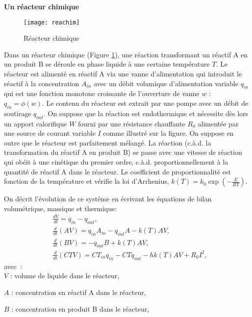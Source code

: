 \begin{exemple}{\bf  Un réacteur chimique }

\begin{figure}[ht]
\begin{center}
\texttt{[image: reachim]}
\caption{Réacteur chimique}
\label{fig:reachim}
\end{center}
\end{figure}
Dans un réacteur chimique (Figure \ref{fig:reachim}), une réaction transformant un réactif A en un produit B se déroule en phase liquide à une certaine température $T$.  Le réacteur est alimenté en réactif
A via une vanne d'alimentation qui introduit le réactif à la concentration
$A_{in}$ avec un débit volumique d'alimentation variable
$q_{in}$ qui est une fonction monotone croissante de l'ouverture de vanne $w$ : $q_{in} = \phi(w)$. Le contenu du réacteur est extrait par une pompe avec un débit de soutirage $q_{out}$. On suppose que la réaction est endothermique et nécessite dès lors un apport calorifique $W$ fourni par une résistance chauffante $R_0$ alimentée par une source de courant variable $I$ comme illustré sur la figure. On suppose en outre que le réacteur est
parfaitement mélangé. La réaction (c.à.d. la transformation du réactif A en
produit B) se passe avec une vitesse de réaction qui obéit à une cinétique du premier ordre, c.à.d. proportionnellement à la quantité de réactif A dans le
réacteur. Le coefficient de proportionnalité est fonction de la température
et vérifie la loi d'Arrhenius, $k(T)=k_0 \exp(-\frac{E}{RT})$.

On décrit l'évolution de ce système en écrivant les équations de bilan volumétrique, massique et thermique:
\begin{equation*} \begin{split} 
&\frac{dV}{dt} = q_{in} - q_{out},\\[0.3em]
&\frac{d}{dt}(AV) = q_{in}A_{in} -q_{out}A-k(T)AV, \\[0.3em]
&\frac{d}{dt}(BV) = -q_{out}B + k(T)AV, \\[0.3em]
&\frac{d}{dt}(CTV) = CT_{in}q_{in}-CTq_{out} - hk(T)AV + R_0I^2,
\end{split} \end{equation*}
avec~:\\

$V$ : volume de liquide dans le réacteur, 

$A$ : concentration en réactif A dans le réacteur,

$B$ : concentration en produit B dans le réacteur,


\end{exemple}

